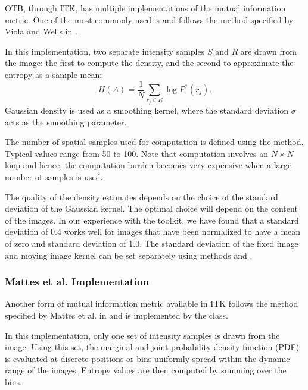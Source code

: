 OTB, through ITK, has multiple implementations of the mutual information
metric. One of the most commonly used is
 and follows the method specified
by Viola and Wells in \cite{Viola1997}.


In this implementation, two separate intensity samples $S$ and $R$ are drawn
from the image: the first to compute the density, and the second to approximate
the entropy as a sample mean:
\begin{equation}
H(A) = \frac{1}{N} \sum_{r_j \in R} \log P^{*}(r_j).
\end{equation}
Gaussian density is used as a smoothing kernel, where the standard deviation
$\sigma$ acts as the smoothing parameter.


The number of spatial samples used for computation is defined using
the  method. Typical values range from 50 to 100.
Note that computation involves an $N \times N$ loop and hence, the computation
burden becomes very expensive when a large number of samples is used.

The quality of the density estimates depends on the choice of the standard
deviation of the Gaussian kernel. The optimal choice will depend on the
content of the images.  In our experience with the toolkit, we have found
that a standard deviation of 0.4 works well for images that have been
normalized to have a mean of zero and standard deviation of 1.0. The standard
deviation of the fixed image and moving image kernel can be set separately
using methods
 and .

\subsubsection{Mattes et al. Implementation}
Another form of mutual information metric available in ITK follows the method
specified by Mattes et al. in \cite{Mattes2001} and is implemented by the
 class.

In this implementation, only one set of intensity samples is drawn from the
image.  Using this set, the marginal and joint probability density function
(PDF) is evaluated at discrete positions or bins uniformly spread within the
dynamic range of the images. Entropy values are then computed by summing over
the bins.

